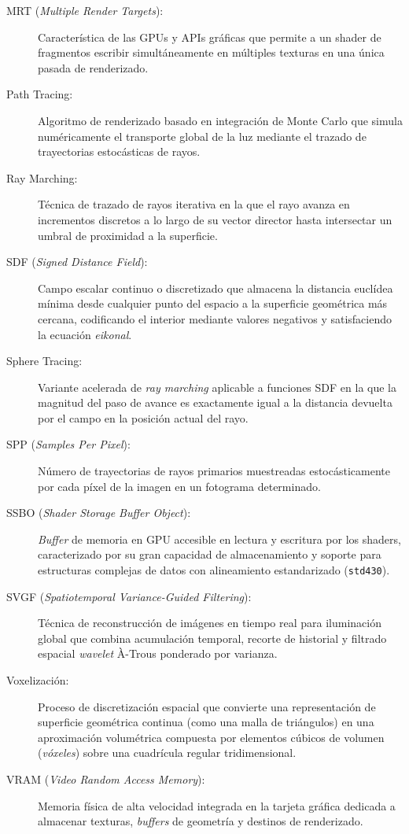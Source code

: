 \begin{description}
  \item[MRT (\textit{Multiple Render Targets}):] Característica de las GPUs y APIs gráficas que permite a un shader de fragmentos escribir simultáneamente en múltiples texturas en una única pasada de renderizado.
  \item[Path Tracing:] Algoritmo de renderizado basado en integración de Monte Carlo que simula numéricamente el transporte global de la luz mediante el trazado de trayectorias estocásticas de rayos.
  \item[Ray Marching:] Técnica de trazado de rayos iterativa en la que el rayo avanza en incrementos discretos a lo largo de su vector director hasta intersectar un umbral de proximidad a la superficie.
  \item[SDF (\textit{Signed Distance Field}):] Campo escalar continuo o discretizado que almacena la distancia euclídea mínima desde cualquier punto del espacio a la superficie geométrica más cercana, codificando el interior mediante valores negativos y satisfaciendo la ecuación \textit{eikonal}.
  \item[Sphere Tracing:] Variante acelerada de \textit{ray marching} aplicable a funciones SDF en la que la magnitud del paso de avance es exactamente igual a la distancia devuelta por el campo en la posición actual del rayo.
  \item[SPP (\textit{Samples Per Pixel}):] Número de trayectorias de rayos primarios muestreadas estocásticamente por cada píxel de la imagen en un fotograma determinado.
  \item[SSBO (\textit{Shader Storage Buffer Object}):] \textit{Buffer} de memoria en GPU accesible en lectura y escritura por los shaders, caracterizado por su gran capacidad de almacenamiento y soporte para estructuras complejas de datos con alineamiento estandarizado (\texttt{std430}).
  \item[SVGF (\textit{Spatiotemporal Variance-Guided Filtering}):] Técnica de reconstrucción de imágenes en tiempo real para iluminación global que combina acumulación temporal, recorte de historial y filtrado espacial \textit{wavelet} À-Trous ponderado por varianza.
  \item[Voxelización:] Proceso de discretización espacial que convierte una representación de superficie geométrica continua (como una malla de triángulos) en una aproximación volumétrica compuesta por elementos cúbicos de volumen (\textit{vóxeles}) sobre una cuadrícula regular tridimensional.
  \item[VRAM (\textit{Video Random Access Memory}):] Memoria física de alta velocidad integrada en la tarjeta gráfica dedicada a almacenar texturas, \textit{buffers} de geometría y destinos de renderizado.
\end{description}
